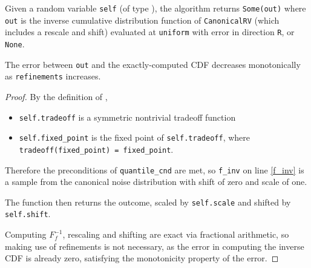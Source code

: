 \documentclass{article}
\begin{document}
\begin{theorem}
Given a random variable \texttt{self} (of type ),
the algorithm returns \texttt{Some(out)} where \texttt{out} is the inverse cumulative distribution function of \texttt{CanonicalRV} (which includes a rescale and shift) evaluated at \texttt{uniform}
with error in direction \texttt{R}, or \texttt{None}.

The error between \texttt{out} and the exactly-computed CDF decreases monotonically as \texttt{refinements} increases.
\end{theorem}

\begin{proof} 

By the definition of ,
\begin{itemize}
    \item \texttt{self.tradeoff} is a symmetric nontrivial tradeoff function
    \item \texttt{self.fixed\_point} is the fixed point of \texttt{self.tradeoff}, where \texttt{tradeoff(fixed\_point) = fixed\_point}.
\end{itemize}

Therefore the preconditions of \texttt{quantile\_cnd} are met,
so \texttt{f\_inv} on line \ref{f_inv} is a sample from the canonical noise distribution with shift of zero and scale of one.

The function then returns the outcome, scaled by \texttt{self.scale} and shifted by \texttt{self.shift}.

Computing $F_f^{-1}$, rescaling and shifting are exact via fractional arithmetic, 
so making use of refinements is not necessary, 
as the error in computing the inverse CDF is already zero, satisfying the monotonicity property of the error.

\end{proof}
\end{document}
